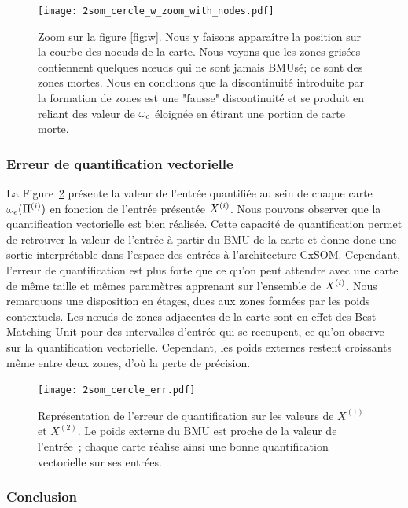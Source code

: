 \documentclass[../main]{subfiles}
\begin{document}
\begin{figure}
	\texttt{[image: 2som\_cercle\_w\_zoom\_with\_nodes.pdf]}
	\caption{Zoom sur la figure \ref{fig:w}. Nous y faisons apparaître la position sur la courbe des noeuds de la carte. Nous voyons que les zones grisées contiennent quelques n\oe{}uds qui ne sont jamais BMUsé; ce sont des zones mortes. Nous en concluons que la discontinuité introduite par la formation de zones est une "fausse" discontinuité et se produit en reliant des valeur de $\omega_c$ éloignée en étirant une portion de carte morte. \label{fig:w_zoom}}
\end{figure}


\subsubsection{Erreur de quantification vectorielle}

La Figure~\ref{fig:qv} présente la valeur de l'entrée quantifiée au sein de chaque carte $\omega_{e}(\Pi^{({i})})$ en fonction de l'entrée présentée $X^{({i})}$. Nous pouvons observer que la quantification vectorielle est bien réalisée. Cette capacité de quantification permet de retrouver la valeur de l'entrée à partir du BMU de la carte et donne donc une sortie interprétable dans l'espace des entrées à l'architecture CxSOM.
Cependant, l'erreur de quantification est plus forte que ce qu'on peut attendre avec une carte de même taille et mêmes paramètres apprenant sur l'ensemble de $X^{({i})}$. Nous remarquons une disposition en étages, dues aux zones formées par les poids contextuels.
Les n\oe{}uds de zones adjacentes de la carte sont en effet des Best Matching Unit pour des intervalles d'entrée qui se recoupent, ce qu'on observe sur la quantification vectorielle. Cependant, les poids externes restent croissants même entre deux zones, d'où la perte de précision. 

\begin{figure}
	\centering\texttt{[image: 2som\_cercle\_err.pdf]}
	\caption{Représentation de l'erreur de quantification sur les valeurs de $X^{(1)}$ et $X^{(2)}$. Le poids externe du BMU est proche de la valeur de l'entrée~; chaque carte réalise ainsi une bonne quantification vectorielle sur ses entrées. \label{fig:qv}}
\end{figure}

\subsubsection{Conclusion}
\end{document}
